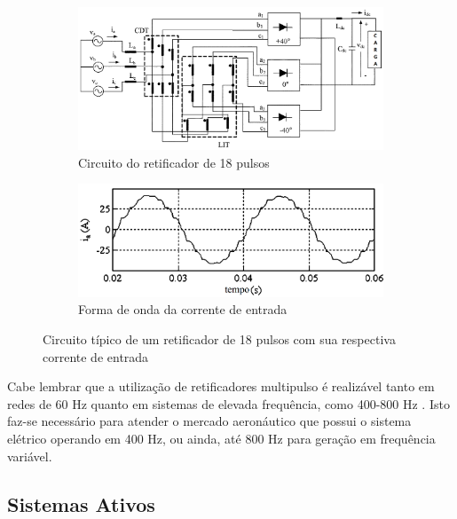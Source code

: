 \begin{figure}[!htbp] %
	\centering
	\begin{subfigure}[b]{0.49\textwidth}
		\centering
		\includegraphics[width=\textwidth]{Cap2/Figuras/18_pulse_rectifier.png}
		\caption{Circuito do retificador de 18 pulsos} 
		\label{fig:18_pulse_rectifier}
	\end{subfigure}%
	\hfill
	\begin{subfigure}[b]{0.49\textwidth}  
		\centering 
		\includegraphics[width=\textwidth]{Cap2/Figuras/18_pulse_wave.png}
		\caption{Forma de onda da corrente de entrada}    
		\label{fig:18_pulse_wave}
	\end{subfigure}%
	\caption{Circuito típico de um retificador de 18 pulsos com sua respectiva corrente de entrada \cite{Singh2008}}
	\label{fig:18_pulse}
\end{figure}

Cabe lembrar que a utilização de retificadores multipulso é realizável tanto em redes de 60 Hz quanto em sistemas de elevada frequência, como 400-800 Hz \cite{Gong2003,Lobo2005}. Isto faz-se necessário para atender o mercado aeronáutico que possui o sistema elétrico operando em 400 Hz, ou ainda, até 800 Hz para geração em frequência variável.

\subsection{Sistemas Ativos}

